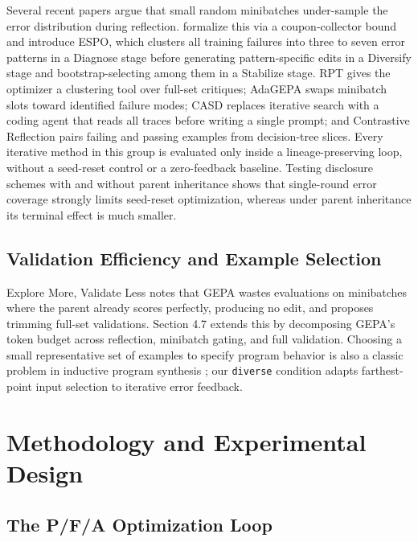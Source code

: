 \documentclass[10pt]{article}
\begin{document}
Several recent papers argue that small random minibatches under-sample
the error distribution during reflection. \citet{liu2026espo} formalize
this via a coupon-collector bound and introduce ESPO, which clusters all
training failures into three to seven error patterns in a Diagnose stage
before generating pattern-specific edits in a Diversify stage and
bootstrap-selecting among them in a Stabilize stage. RPT
\citep{bayat2026reflective} gives the optimizer a clustering tool over
full-set critiques; AdaGEPA \citep{chen2026adagepa} swaps minibatch
slots toward identified failure modes; CASD \citep{singh2026coding}
replaces iterative search with a coding agent that reads all traces
before writing a single prompt; and Contrastive Reflection
\citep{koh2026contrastive} pairs failing and passing examples from
decision-tree slices. Every iterative method in this group is evaluated
only inside a lineage-preserving loop, without a seed-reset control or a
zero-feedback baseline. Testing disclosure schemes with and without
parent inheritance shows that single-round error coverage strongly
limits seed-reset optimization, whereas under parent inheritance its
terminal effect is much smaller.

\hypertarget{validation-efficiency-and-example-selection}{%
\subsection{Validation Efficiency and Example
Selection}\label{validation-efficiency-and-example-selection}}

Explore More, Validate Less \citep{zhou2026explore} notes that GEPA
wastes evaluations on minibatches where the parent already scores
perfectly, producing no edit, and proposes trimming full-set
validations. Section 4.7 extends this by decomposing GEPA's token budget
across reflection, minibatch gating, and full validation. Choosing a
small representative set of examples to specify program behavior is also
a classic problem in inductive program synthesis
\citep{pu2017selecting}; our \texttt{diverse} condition adapts
farthest-point input selection to iterative error feedback.

\hypertarget{methodology-and-experimental-design}{%
\section{Methodology and Experimental
Design}\label{methodology-and-experimental-design}}

\hypertarget{the-pfa-optimization-loop}{%
\subsection{The P/F/A Optimization
Loop}\label{the-pfa-optimization-loop}}
\end{document}
